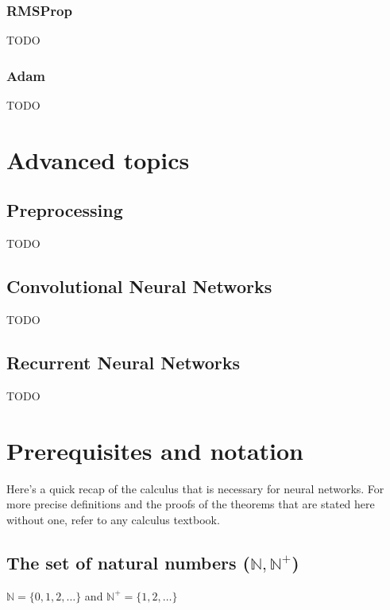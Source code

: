 \documentclass{article}
\begin{document}
      \subsubsection{RMSProp}

        TODO

      \subsubsection{Adam}

        TODO

    \section{Advanced topics}

      \subsection{Preprocessing}

        TODO

      \subsection{Convolutional Neural Networks}

        TODO

      \subsection{Recurrent Neural Networks}

        TODO

  \newpage

  \appendix

    \section{Prerequisites and notation}

      Here's a quick recap of the calculus that is necessary for neural
      networks. For more precise definitions and the proofs of the theorems that
      are stated here without one, refer to any calculus textbook.

      \subsection{The set of natural numbers ($\mathbb{N}, \mathbb{N}^+$)}
        $\mathbb{N} = \{ 0, 1, 2, \ldots \}$ and
        $\mathbb{N}^+ = \{ 1, 2, \ldots \}$
\end{document}
